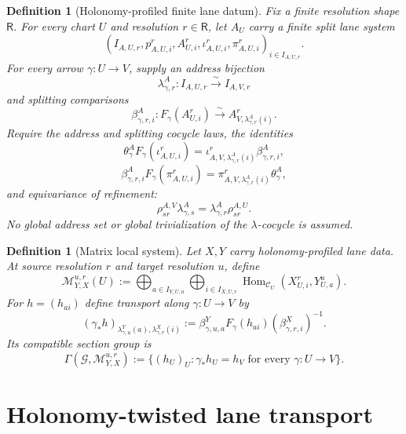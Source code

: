 \documentclass[11pt]{article}
\newtheorem{definition}[theorem]{Definition}
\newcommand{\HomC}{\operatorname{Hom}}
\begin{document}
\begin{definition}[Holonomy-profiled finite lane datum]
Fix a finite resolution shape \(\mathsf R\).  For every chart \(U\) and resolution \(r\in\mathsf R\), let \(A_U\) carry a finite split lane system
\[
 \left(I_{A,U,r},p^r_{A,U,i},A^r_{U,i},\iota^r_{A,U,i},\pi^r_{A,U,i}\right)_{i\in I_{A,U,r}}.
\]
For every arrow \(\gamma:U\to V\), supply an address bijection
\[
 \lambda^A_{\gamma,r}:I_{A,U,r}\xrightarrow{\sim}I_{A,V,r}
\]
and splitting comparisons
\[
 \beta^A_{\gamma,r,i}:F_\gamma(A^r_{U,i})
 \xrightarrow{\sim}A^r_{V,\lambda^A_{\gamma,r}(i)}.
\]
Require the address and splitting cocycle laws, the identities
\[
 \theta^A_\gamma F_\gamma(\iota^r_{A,U,i})
 =\iota^r_{A,V,\lambda^A_{\gamma,r}(i)}\beta^A_{\gamma,r,i},
\]
\[
 \beta^A_{\gamma,r,i}F_\gamma(\pi^r_{A,U,i})
 =\pi^r_{A,V,\lambda^A_{\gamma,r}(i)}\theta^A_\gamma,
\]
and equivariance of refinement:
\[
 \rho^{A,V}_{sr}\lambda^A_{\gamma,s}
 =\lambda^A_{\gamma,r}\rho^{A,U}_{sr}.
\]
No global address set or global trivialization of the \(\lambda\)-cocycle is assumed.
\end{definition}

\begin{definition}[Matrix local system]
Let \(X,Y\) carry holonomy-profiled lane data.  At source resolution \(r\) and target resolution \(u\), define
\[
 \mathscr M^{u,r}_{Y,X}(U)
 :=
 \bigoplus_{a\in I_{Y,U,u}}
 \bigoplus_{i\in I_{X,U,r}}
 \HomC_{\mathcal C_U}(X^r_{U,i},Y^u_{U,a}).
\]
For \(h=(h_{ai})\) define transport along \(\gamma:U\to V\) by
\[
 (\gamma_*h)_{\lambda^Y_{\gamma,u}(a),\lambda^X_{\gamma,r}(i)}
 :=
 \beta^Y_{\gamma,u,a}F_\gamma(h_{ai})
 (\beta^X_{\gamma,r,i})^{-1}.
\]
Its compatible section group is
\[
 \Gamma(\mathscr G,\mathscr M^{u,r}_{Y,X})
 :=\{(h_U)_U:\gamma_*h_U=h_V\text{ for every }\gamma:U\to V\}.
\]
\end{definition}

\section{Holonomy-twisted lane transport}
\end{document}
